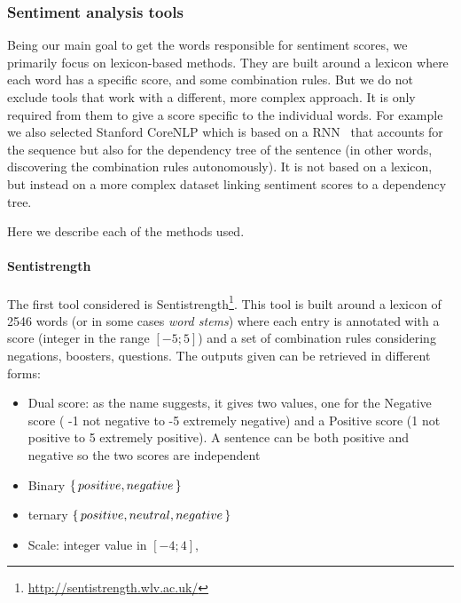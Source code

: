 \subsubsection{\statusgreen Sentiment analysis tools}

Being our main goal to get the words responsible for sentiment scores, we primarily focus on lexicon-based methods.
They are built around a lexicon where each word has a specific score, and some combination rules. But we do not exclude tools that work with a different, more complex approach. It is only required from them to give a score specific to the individual words. For example we also selected Stanford CoreNLP which is based on a RNN~\citep{socher2013recursive} that accounts for the sequence but also for the dependency tree of the sentence (in other words, discovering the combination rules autonomously). It is not based on a lexicon, but instead on a more complex dataset linking sentiment scores to a dependency tree.

Here we describe each of the methods used.

\paragraph{Sentistrength}
The first tool considered is Sentistrength\footnote{\url{http://sentistrength.wlv.ac.uk/}}. This tool is built around a lexicon of 2546 words (or in some cases \emph{word stems}) where each entry is annotated with a score (integer in the range $[-5;5]$) and a set of combination rules considering negations, boosters, questions.
The outputs given can be retrieved in different forms:
\begin{itemize}
    \item Dual score: as the name suggests, it gives two values, one for the Negative score ( -1 not negative to -5 extremely negative) and a Positive score (1 not positive to 5 extremely positive). A sentence can be both positive and negative so the two scores are independent
    \item Binary $\set{positive, negative}$
    \item ternary $\set{positive, neutral, negative}$
    \item Scale: integer value in $[-4;4]$,
\end{itemize}

